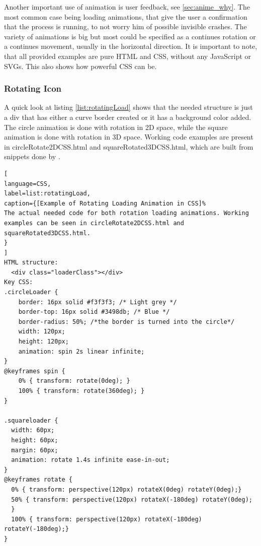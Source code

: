Another important use of animation is user feedback, see \ref{sec:anime_why}. The most common case being loading animations, that give the user a confirmation that the process is running, to not worry him of possible invisible crashes. The variety of animations is big but most could be specified as a continues rotation or a continues movement, usually in the horizontal direction. It is important to note, that all provided examples are pure HTML and CSS, without any JavaScript or SVGs. This also shows how powerful CSS can be.

\subsubsection{Rotating Icon} %
\label{subsub:rotation_loader}
A quick look at listing \ref{list:rotatingLoad} shows that the needed structure is just a div that has either a curve border created or it has a background color added. The circle animation is done with rotation in 2D space, while the square animation is done with rotation in 3D space. Working code examples are present in circleRotate2DCSS.html and squareRotated3DCSS.html, which are built from snippets done by \citet{cirleLoader,otherLoaders}.

\begin{lstlisting}[
language=CSS,
label=list:rotatingLoad,
caption={[Example of Rotating Loading Animation in CSS]%
The actual needed code for both rotation loading animations. Working examples can be seen in circleRotate2DCSS.html and squareRotated3DCSS.html.
}
]
HTML structure:
  <div class="loaderClass"></div>
Key CSS:
.circleLoader {
	border: 16px solid #f3f3f3; /* Light grey */
	border-top: 16px solid #3498db; /* Blue */
	border-radius: 50%; /*the border is turned into the circle*/
	width: 120px;
	height: 120px;
	animation: spin 2s linear infinite;
}
@keyframes spin {
	0% { transform: rotate(0deg); }
	100% { transform: rotate(360deg); }
}

.squareloader {
  width: 60px;
  height: 60px;
  margin: 60px;
  animation: rotate 1.4s infinite ease-in-out;
}
@keyframes rotate {
  0% { transform: perspective(120px) rotateX(0deg) rotateY(0deg);}
  50% { transform: perspective(120px) rotateX(-180deg) rotateY(0deg);
  }
  100% { transform: perspective(120px) rotateX(-180deg) rotateY(-180deg);}
}
\end{lstlisting}

